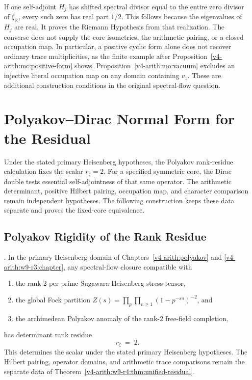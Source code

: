 \begin{remark}
\label{v4-arith:w9-r4:rem:honest-summary}
If one self-adjoint $H_j$ has shifted spectral divisor equal to
the entire zero divisor of $\xi_{\mathbb R}$, every such zero has
real part $1/2$. This follows because the eigenvalues of $H_j$
are real. It proves the Riemann Hypothesis from that realization.
The converse does not supply the core isometries, the arithmetic
pairing, or a closed occupation map. In particular, a positive
cyclic form alone does not recover ordinary trace multiplicities,
as the finite example after Proposition~\ref{v4-arith:mc:positive-form}
shows. Proposition~\ref{v4-arith:mo:vacuum} excludes an injective
literal occupation map on any domain containing $v_1$.
These are additional construction conditions in the original
spectral-flow question.
\end{remark}

\section{Polyakov--Dirac Normal Form for the Residual}
\label{v4-arith:w9-r4:polyakov-dirac-normal-form}

Under the stated primary Heisenberg hypotheses, the Polyakov
rank-residue calculation fixes the scalar $r_\zeta=2$.
For a specified symmetric core, the Dirac double tests essential
self-adjointness of that same operator. The arithmetic determinant,
positive Hilbert pairing, occupation map, and character comparison
remain independent hypotheses. The following construction keeps
these data separate and proves the fixed-core equivalence.

\subsection{Polyakov Rigidity of the Rank Residue}
\label{v4-arith:w9-r4:pdnf:polyakov}

\begin{proposition}
\label{v4-arith:w9-r4:prop:polyakov-scalar-rigidity}
\ClaimStatusProvedHere. In the primary Heisenberg domain of
Chapters~\ref{v4-arith:polyakov} and
\ref{v4-arith:w9-r3:chapter}, any spectral-flow closure compatible
with
\begin{enumerate}
\item the rank-\(2\) per-prime Sugawara Heisenberg stress tensor,
\item the global Fock partition
\(Z(s)=\prod_{p}\prod_{n\geq 1}(1-p^{-sn})^{-2}\), and
\item the archimedean Polyakov anomaly of the rank-\(2\) free-field
completion,
\end{enumerate}
has determinant rank residue
\begin{equation}
\label{v4-arith:w9-r4:eq:polyakov-rigid-c}
r_{\zeta}\;=\;2.
\end{equation}
This determines the scalar under the stated primary Heisenberg
hypotheses. The Hilbert pairing, operator domains, and arithmetic
trace comparisons remain the separate data of
Theorem~\ref{v4-arith:w9-r4:thm:unified-residual}.
\end{proposition}

